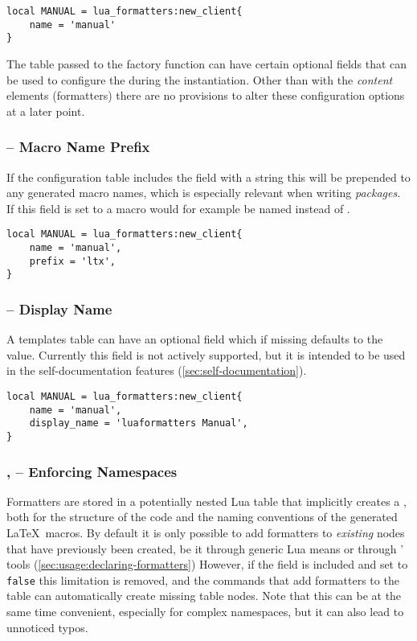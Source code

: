 \documentclass[12pt]{scrartcl}
\begin{document}
\begin{verbatim}
local MANUAL = lua_formatters:new_client{
	name = 'manual'
}
\end{verbatim}

\noindent The table passed to the factory function can have certain optional
fields that can be used to configure the  during the
instantiation. Other than with the \emph{content} elements (formatters) there
are no provisions to alter these configuration options at a later point.

\subsubsection[Macro Name Prefix]{ -- Macro Name Prefix}

If the configuration table includes the  field with a string this
will be prepended to any generated macro names, which is especially relevant
when writing \emph{packages}.  If this field is set to  a macro
would for example be named  instead of .

\begin{verbatim}
local MANUAL = lua_formatters:new_client{
	name = 'manual',
	prefix = 'ltx',
}
\end{verbatim}


\subsubsection[Display Name]{ -- Display Name}

A templates table can have an optional field  which if
missing defaults to the  value.  Currently this field is not
actively supported, but it is intended to be used in the self-documentation
features (\vref{sec:self-documentation}).

\begin{verbatim}
local MANUAL = lua_formatters:new_client{
	name = 'manual',
	display_name = 'luaformatters Manual',
}
\end{verbatim}

\subsubsection[Enforcing Namespaces]{,  -- Enforcing Namespaces}

Formatters are stored in a potentially nested Lua table that implicitly creates
a , both for the structure of the code and the naming
conventions of the generated \LaTeX\ macros. By default it is only possible to
add formatters to \emph{existing} nodes that have previously been created, be it
through generic Lua means or through \luaformatters' tools
(\vref{sec:usage:declaring-formatters})  However, if the  field
is included and set to \texttt{false} this limitation is removed, and the
commands that add formatters to the table can automatically create missing table
nodes. Note that this can be at the same time convenient, especially for complex
namespaces, but it can also lead to unnoticed typos.
\end{document}

